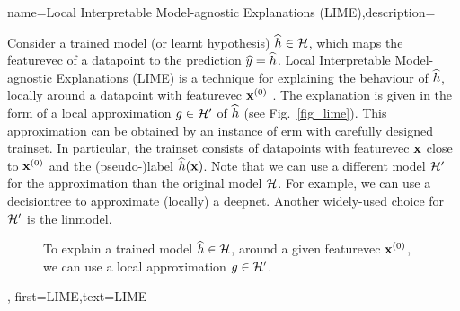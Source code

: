 {name={Local Interpretable Model-agnostic Explanations (LIME)},description={
		Consider 
		a trained \gls{model} (or learnt \gls{hypothesis}) $\widehat{h} \in \mathcal{H}$, 
		which maps the \gls{featurevec} of a \gls{datapoint} to the \gls{prediction} $\widehat{y}= \widehat{h}$. 
		Local Interpretable Model-agnostic Explanations (LIME) is a technique for explaining 
		the behaviour of $\widehat{h}$, locally around a \gls{datapoint} with \gls{featurevec} ${\bf x}^{(0)}$ \cite{Ribeiro2016}. 
		The explanation is given in the form of a local approximation $g \in \mathcal{H}'$ of $\widehat{h}$ (see Fig.\ \ref{fig_lime}). 
		This approximation can be obtained by an instance of \gls{erm} with carefully designed 
		\gls{trainset}. In particular, the \gls{trainset} consists of \gls{datapoint}s with 
		\gls{featurevec} ${\bf x}$ close to ${\bf x}^{(0)}$ and the (pseudo-)label $\widehat{h}({\bf x})$. 
		Note that we can use a different \gls{model} $\mathcal{H}'$ for the approximation than 
		the original \gls{model} $\mathcal{H}$. For example, we can use a \gls{decisiontree} 
		to approximate (locally) a \gls{deepnet}. Another widely-used choice for $\mathcal{H}'$ is 
		the \gls{linmodel}. 
		\begin{figure}[htbp]
		\begin{center}
		\end{center}
		\caption{To explain a trained \gls{model} $\widehat{h} \in \mathcal{H}$, around a 
		given \gls{featurevec} ${\bf x}^{(0)}$, we can use a local approximation $g \in \mathcal{H}'$. }
		\end{figure}\label{fig_lime}},
	first={LIME},text={LIME}
}
	
